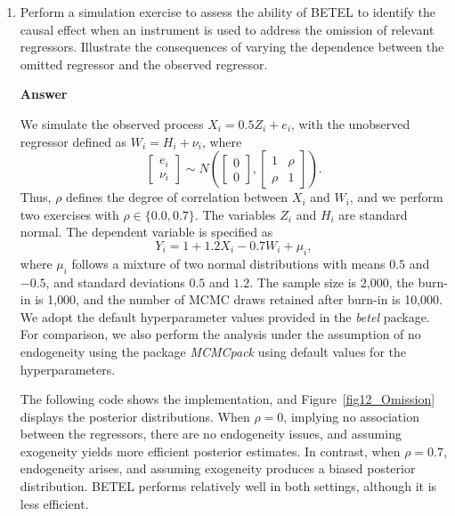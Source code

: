 \begin{enumerate}[leftmargin=*]
\item Perform a simulation exercise to assess the ability of BETEL to identify the causal effect when an instrument is used to address the omission of relevant regressors. Illustrate the consequences of varying the dependence between the omitted regressor and the observed regressor.

\textbf{Answer}

We simulate the observed process $X_i = 0.5Z_i + e_i$, with the unobserved regressor defined as $W_i = H_i + \nu_i$, where 
\[
\begin{bmatrix}
	e_i \\
	\nu_i
\end{bmatrix}\sim N\left(\begin{bmatrix}
0\\
0
\end{bmatrix},\begin{bmatrix}
1 & \rho\\
\rho & 1
\end{bmatrix}\right).
\]
Thus, $\rho$ defines the degree of correlation between $X_i$ and $W_i$, and we perform two exercises with $\rho \in \{0.0, 0.7\}$. The variables $Z_i$ and $H_i$ are standard normal. The dependent variable is specified as 
\[
Y_i = 1 + 1.2X_i - 0.7W_i + \mu_i,
\]
where $\mu_i$ follows a mixture of two normal distributions with means $0.5$ and $-0.5$, and standard deviations $0.5$ and $1.2$. The sample size is 2{,}000, the burn-in is 1{,}000, and the number of MCMC draws retained after burn-in is 10{,}000. We adopt the default hyperparameter values provided in the \textit{betel} package. For comparison, we also perform the analysis under the assumption of no endogeneity using the package \textit{MCMCpack} using default values for the hyperparameters. 

The following code shows the implementation, and Figure~\ref{fig12_Omission} displays the posterior distributions. When $\rho = 0$, implying no association between the regressors, there are no endogeneity issues, and assuming exogeneity yields more efficient posterior estimates. In contrast, when $\rho = 0.7$, endogeneity arises, and assuming exogeneity produces a biased posterior distribution. BETEL performs relatively well in both settings, although it is less efficient.


\end{enumerate}
